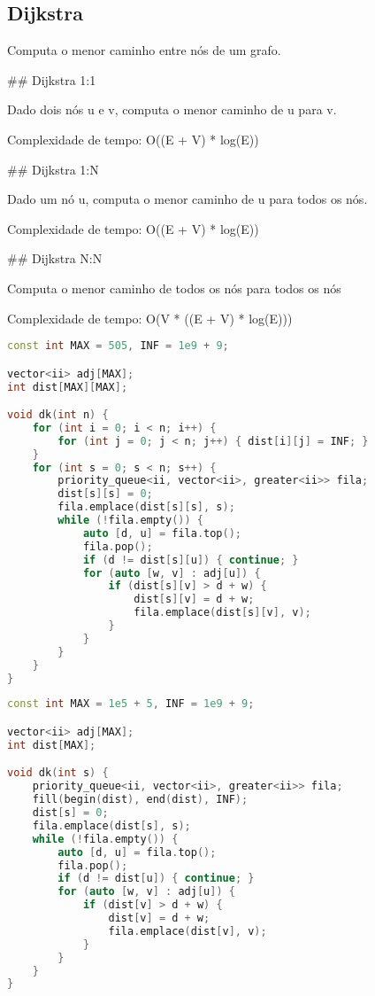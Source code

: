 \documentclass[11pt, a4paper, twoside]{article}
\begin{document}
\subsection{Dijkstra}


Computa o menor caminho entre nós de um grafo.

\#\# Dijkstra 1:1

Dado dois nós u e v, computa o menor caminho de u para v.

Complexidade de tempo: O((E + V) * log(E))

\#\# Dijkstra 1:N

Dado um nó u, computa o menor caminho de u para todos os nós.

Complexidade de tempo: O((E + V) * log(E))

\#\# Dijkstra N:N

Computa o menor caminho de todos os nós para todos os nós

Complexidade de tempo: O(V * ((E + V) * log(E)))

\begin{lstlisting}[language=C++]
const int MAX = 505, INF = 1e9 + 9;

vector<ii> adj[MAX];
int dist[MAX][MAX];

void dk(int n) {
    for (int i = 0; i < n; i++) {
        for (int j = 0; j < n; j++) { dist[i][j] = INF; }
    }
    for (int s = 0; s < n; s++) {
        priority_queue<ii, vector<ii>, greater<ii>> fila;
        dist[s][s] = 0;
        fila.emplace(dist[s][s], s);
        while (!fila.empty()) {
            auto [d, u] = fila.top();
            fila.pop();
            if (d != dist[s][u]) { continue; }
            for (auto [w, v] : adj[u]) {
                if (dist[s][v] > d + w) {
                    dist[s][v] = d + w;
                    fila.emplace(dist[s][v], v);
                }
            }
        }
    }
}
\end{lstlisting}

\begin{multicols}{2}
\begin{lstlisting}[language=C++]
const int MAX = 1e5 + 5, INF = 1e9 + 9;

vector<ii> adj[MAX];
int dist[MAX];

void dk(int s) {
    priority_queue<ii, vector<ii>, greater<ii>> fila;
    fill(begin(dist), end(dist), INF);
    dist[s] = 0;
    fila.emplace(dist[s], s);
    while (!fila.empty()) {
        auto [d, u] = fila.top();
        fila.pop();
        if (d != dist[u]) { continue; }
        for (auto [w, v] : adj[u]) {
            if (dist[v] > d + w) {
                dist[v] = d + w;
                fila.emplace(dist[v], v);
            }
        }
    }
}
\end{lstlisting}
\end{multicols}
\end{document}
